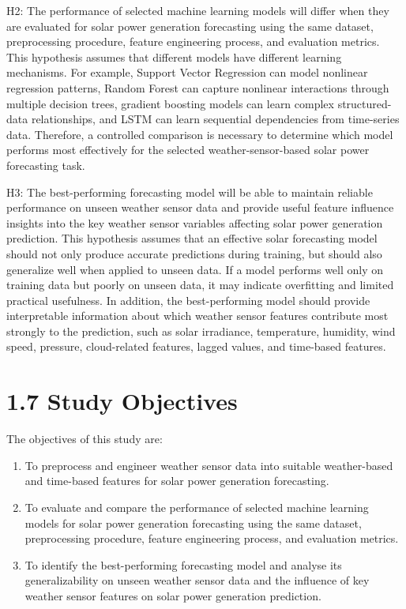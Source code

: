 H2: The performance of selected machine learning models will differ when they are evaluated for solar power generation forecasting using the same dataset, preprocessing procedure, feature engineering process, and evaluation metrics. This hypothesis assumes that different models have different learning mechanisms. For example, Support Vector Regression can model nonlinear regression patterns, Random Forest can capture nonlinear interactions through multiple decision trees, gradient boosting models can learn complex structured-data relationships, and LSTM can learn sequential dependencies from time-series data. Therefore, a controlled comparison is necessary to determine which model performs most effectively for the selected weather-sensor-based solar power forecasting task.

H3: The best-performing forecasting model will be able to maintain reliable performance on unseen weather sensor data and provide useful feature influence insights into the key weather sensor variables affecting solar power generation prediction. This hypothesis assumes that an effective solar forecasting model should not only produce accurate predictions during training, but should also generalize well when applied to unseen data. If a model performs well only on training data but poorly on unseen data, it may indicate overfitting and limited practical usefulness. In addition, the best-performing model should provide interpretable information about which weather sensor features contribute most strongly to the prediction, such as solar irradiance, temperature, humidity, wind speed, pressure, cloud-related features, lagged values, and time-based features.


\section{1.7 Study Objectives}

The objectives of this study are:

\begin{enumerate}
    \item To preprocess and engineer weather sensor data into suitable weather-based and time-based features for solar power generation forecasting.

    \item To evaluate and compare the performance of selected machine learning models for solar power generation forecasting using the same dataset, preprocessing procedure, feature engineering process, and evaluation metrics.

    \item To identify the best-performing forecasting model and analyse its generalizability on unseen weather sensor data and the influence of key weather sensor features on solar power generation prediction.
\end{enumerate}

